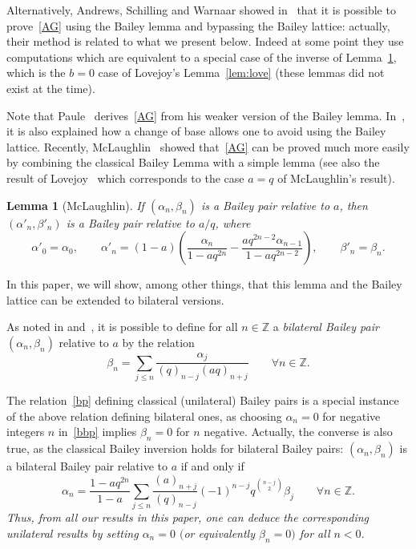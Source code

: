\documentclass[pdftex]{sigma}
\numberwithin{equation}{section}
\newtheorem{Lemma}[Theorem]{Lemma}
\begin{document}
Alternatively, Andrews, Schilling and Warnaar showed in~\cite[Section~3]{ASW} that it is possible to prove~\eqref{AG} using the Bailey lemma and bypassing the Bailey lattice: actually, their method is related to what we present below. Indeed at some point they use computations which are equivalent to a special case of the inverse of Lemma~\ref{lem:Mac}, which is the $b=0$ case of Lovejoy's Lemma~\ref{lem:love} (these lemmas did not exist at the time).

Note that Paule~\cite{P} derives~\eqref{AG} from his weaker version of the Bailey lemma. In~\cite{BIS}, it is also explained how a change of base allows one to avoid using the Bailey lattice. Recently, McLaughlin~\cite{M} showed that~\eqref{AG} can be proved much more easily by combining the classical Bailey Lemma with a simple lemma (see also the result of Lovejoy~\cite[Lemma 2.2]{Lo22} which corresponds to the case $a=q$ of McLaughlin's result).
\begin{Lemma}[McLaughlin]
\label{lem:Mac}
If $(\alpha_n, \beta_n)$ is a Bailey pair relative to $a$, then $(\alpha'_n, \beta'_n)$ is a Bailey pair relative to $a/q$, where
\begin{equation*}
\alpha'_0=\alpha_0, \qquad \alpha'_n=(1-a)\left(\frac{\alpha_n}{1-aq^{2n}}-\frac{aq^{2n-2}\alpha_{n-1}}{1-aq^{2n-2}}\right), \qquad \beta'_n=\beta_n.
\end{equation*}
\end{Lemma}

In this paper, we will show, among other things, that this lemma and the Bailey lattice can be extended to bilateral versions.


As noted in \cite{BMS} and~\cite{J}, it is possible to define for all $n\in\mathbb{Z}$ a \emph{bilateral Bailey pair} $(\alpha_n, \beta_n)$ relative to $a$ by the relation
\begin{equation}\label{bbp}
\beta_n=\sum_{j\leq n}\frac{\alpha_j}{(q)_{n-j}(aq)_{n+j}}\qquad\forall n\in\mathbb{Z}.
\end{equation}

\begin{Remark}\label{rk:bilatinversion}
The relation~\eqref{bp} defining classical (unilateral) Bailey pairs is a special instance of the above relation defining bilateral ones, as choosing $\alpha_n=0$ for negative integers $n$ in~\eqref{bbp} implies $\beta_n=0$ for $n$ negative. Actually, the converse is also true, as the classical Bailey inversion holds for bilateral Bailey pairs: $(\alpha_n, \beta_n)$ is a bilateral Bailey pair relative to $a$ if and only if
\begin{equation}\label{bilatinversion}
\alpha_n=\frac{1-aq^{2n}}{1-a}\sum_{j\leq n}\frac{(a)_{n+j}}{(q)_{n-j}}(-1)^{n-j}q^{\binom{n-j}{2}}\beta_j\qquad\forall n\in\mathbb{Z}.
\end{equation}
\textit{Thus, from all our results in this paper, one can deduce the corresponding unilateral results by setting $\alpha_n=0$ $($or equivalently $\beta_n=0)$ for all $n<0$.}
\end{Remark}
\end{document}
